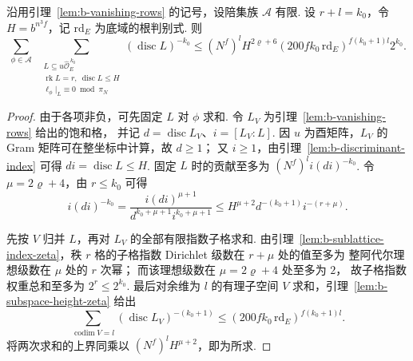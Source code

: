 \begin{lemma}[幺模格上的消失行与格的总权重]
\label{lem:b-row-lattice-sum}
\emitthmsource
沿用引理~\ref{lem:b-vanishing-rows} 的记号，设陪集族 $\mathcal A$ 有限.
设 $r+l=k_0$，令 $H=b^{n^3 f}$，记 $\mathrm{rd}_E$ 为底域的根判别式. 则
\[
 \sum_{\phi\in\mathcal A}\ \
 \sum_{\substack{L\subseteq u\widehat{\mathcal O}_E^{\,k_0}\\
          \operatorname{rk}L=r,\ \operatorname{disc}L\le H\\
          \ell_\phi|_L\equiv0\bmod\pi_N}}(\operatorname{disc}L)^{-k_0}
 \le
 (N^f)^l H^{2\varrho+6}
        (200 f k_0\,\mathrm{rd}_E)^{f(k_0+1)l} 2^{k_0}.
\]
\end{lemma}
\begin{proof}
由于各项非负，可先固定 $L$ 对 $\phi$ 求和.
令 $L_V$ 为引理~\ref{lem:b-vanishing-rows} 给出的饱和格，
并记 $d=\operatorname{disc}L_V$、$i=[L_V:L]$.
因 $u$ 为酉矩阵，$L_V$ 的 Gram 矩阵可在整坐标中计算，故 $d\ge1$；
又 $i\ge1$，由引理~\ref{lem:b-discriminant-index} 可得 $di=\operatorname{disc}L\le H$.
固定 $L$ 时的贡献至多为 $(N^f)^l i(di)^{-k_0}$.
令 $\mu=2\varrho+4$，由 $r\le k_0$ 可得
\[
 i(di)^{-k_0}
 =\frac{i(di)^{\mu+1}}{d^{k_0+\mu+1}i^{k_0+\mu+1}}
 \le H^{\mu+2}d^{-(k_0+1)}i^{-(r+\mu)}.
\]

先按 $V$ 归并 $L$，再对 $L_V$ 的全部有限指数子格求和.
由引理~\ref{lem:b-sublattice-index-zeta}，秩 $r$ 格的子格指数 Dirichlet 级数在 $r+\mu$ 处的值至多为
整阿代尔理想级数在 $\mu$ 处的 $r$ 次幂；
而该理想级数在 $\mu=2\varrho+4$ 处至多为 $2$，
故子格指数权重总和至多为 $2^r\le 2^{k_0}$.
最后对余维为 $l$ 的有理子空间 $V$ 求和，引理~\ref{lem:b-subspace-height-zeta} 给出
\[
 \sum_{\operatorname{codim}V=l}
           (\operatorname{disc}L_V)^{-(k_0+1)}
 \le (200 f k_0\,\mathrm{rd}_E)^{f(k_0+1)l}.
\]
将两次求和的上界同乘以 $(N^f)^l H^{\mu+2}$，即为所求.
\end{proof}

